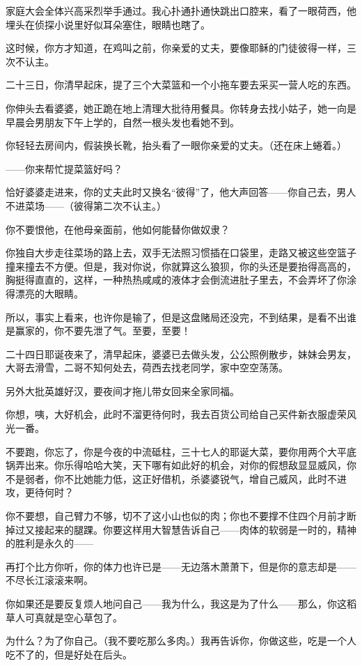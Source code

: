 \par 家庭大会全体兴高采烈举手通过。我心扑通扑通快跳出口腔来，看了一眼荷西，他埋头在侦探小说里好似耳朵塞住，眼睛也瞎了。
\par 这时候，你方才知道，在鸡叫之前，你亲爱的丈夫，要像耶稣的门徒彼得一样，三次不认主。
\par 二十三日，你清早起床，提了三个大菜篮和一个小拖车要去采买一营人吃的东西。
\par 你伸头去看婆婆，她正跪在地上清理大批待用餐具。你转身去找小姑子，她一向是早晨会男朋友下午上学的，自然一根头发也看她不到。
\par 你轻轻去房间内，假装换长靴，抬头看了一眼你亲爱的丈夫。（还在床上蜷着。）
\par ——你来帮忙提菜篮好吗？
\par 恰好婆婆走进来，你的丈夫此时又换名“彼得”了，他大声回答——你自己去，男人不进菜场——（彼得第二次不认主。）
\par 你不要恨他，在他母亲面前，他如何能替你做奴隶？
\par 你独自大步走往菜场的路上去，双手无法照习惯插在口袋里，走路又被这些空篮子撞来撞去不方便。但是，我对你说，你就算这么狼狈，你的头还是要抬得高高的，胸挺得直直的，这样，一种热热咸咸的液体才会倒流进肚子里去，不会弄坏了你涂得漂亮的大眼睛。
\par 所以，事实上看来，也许你是输了，但是这盘赌局还没完，不到结果，是看不出谁是赢家的，你不要先泄了气。至要，至要！
\par 二十四日耶诞夜来了，清早起床，婆婆已去做头发，公公照例散步，妹妹会男友，大哥去滑雪，二哥不知何处去，荷西去找老同学，家中空空荡荡。
\par 另外大批英雄好汉，要夜间才拖儿带女回来全家同福。
\par 你想，咦，大好机会，此时不溜更待何时，我去百货公司给自己买件新衣服虚荣风光一番。
\par 不要跑，你忘了，你是今夜的中流砥柱，三十七人的耶诞大菜，要你用两个大平底锅弄出来。你乐得哈哈大笑，天下哪有如此好的机会，对你的假想敌显显威风，你不是弱者，你不比她能力低，这正好借机，杀婆婆锐气，增自己威风，此时不进攻，更待何时？
\par 你不要想，自己臂力不够，切不了这小山也似的肉；你也不要撑不住四个月前才断掉过又接起来的腿踝。你要这样用大智慧告诉自己——肉体的软弱是一时的，精神的胜利是永久的——
\par 再打个比方你听，你的体力也许已是——无边落木萧萧下，但是你的意志却是——不尽长江滚滚来啊。
\par 你如果还是要反复烦人地问自己——我为什么，我这是为了什么——那么，你这稻草人可真就是空心草包了。
\par 为什么？为了你自己。（我不要吃那么多肉。）我再告诉你，你做这些，吃是一个人吃不了的，但是好处在后头。
